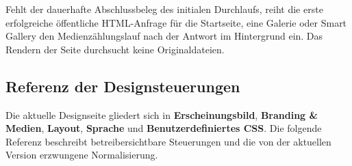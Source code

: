 \documentclass[11pt,a4paper]{article}
\newcommand{\ui}[1]{\textbf{#1}}
\begin{document}
Fehlt der dauerhafte Abschlussbeleg des initialen Durchlaufs, reiht die erste
erfolgreiche öffentliche HTML-Anfrage für die Startseite, eine Galerie oder
Smart Gallery den Medienzählungslauf nach der Antwort im Hintergrund ein. Das
Rendern der Seite durchsucht keine Originaldateien.

\subsection{Referenz der Designsteuerungen}

Die aktuelle Designseite gliedert sich in \ui{Erscheinungsbild}, \ui{Branding \&
Medien}, \ui{Layout}, \ui{Sprache} und \ui{Benutzerdefiniertes CSS}. Die
folgende Referenz beschreibt betreibersichtbare Steuerungen und die von der
aktuellen Version erzwungene Normalisierung.
\end{document}
